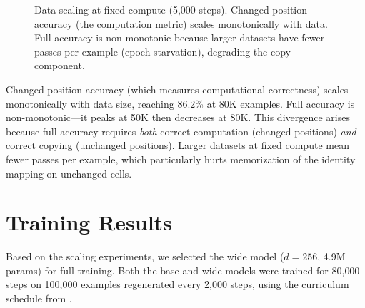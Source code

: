 \documentclass[11pt,a4paper]{article}
\begin{document}
\begin{figure}[h]
\centering
{}
\caption{Data scaling at fixed compute (5{,}000 steps). Changed-position accuracy (the computation metric) scales monotonically with data. Full accuracy is non-monotonic because larger datasets have fewer passes per example (epoch starvation), degrading the copy component.}
\label{fig:data_scaling}
\end{figure}

\begin{observation}
Changed-position accuracy (which measures computational correctness) scales monotonically with data size, reaching 86.2\% at 80K examples.
Full accuracy is non-monotonic---it peaks at 50K then decreases at 80K.
This divergence arises because full accuracy requires \emph{both} correct computation (changed positions) \emph{and} correct copying (unchanged positions).
Larger datasets at fixed compute mean fewer passes per example, which particularly hurts memorization of the identity mapping on unchanged cells.
\end{observation}

\section{Training Results}
\label{sec:results}

Based on the scaling experiments, we selected the wide model ($d = 256$, 4.9M params) for full training.
Both the base and wide models were trained for 80{,}000 steps on 100{,}000 examples regenerated every 2{,}000 steps, using the curriculum schedule from .
\end{document}
